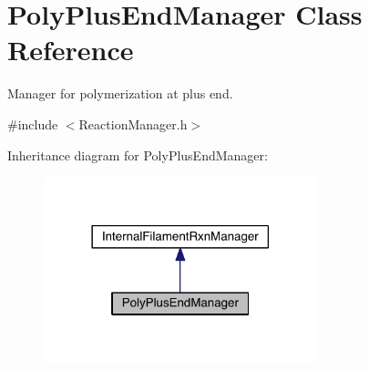 \hypertarget{classPolyPlusEndManager}{\section{Poly\+Plus\+End\+Manager Class Reference}
\label{classPolyPlusEndManager}
}


Manager for polymerization at plus end.  




{\ttfamily \#include $<$Reaction\+Manager.\+h$>$}



Inheritance diagram for Poly\+Plus\+End\+Manager\+:
\nopagebreak
\begin{figure}[H]
\begin{center}
\leavevmode
\includegraphics[width=225pt]{classPolyPlusEndManager__inherit__graph}
\end{center}
\end{figure}


